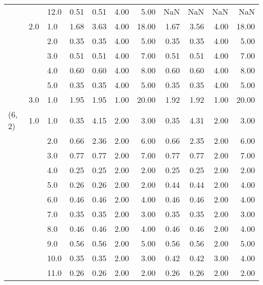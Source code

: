 \begin{tabular}{lllrrrrrrrr}
       &     & 12.0 &       0.51 &      0.51 & 4.00 &   5.00 &        NaN &       NaN &  NaN &    NaN \\
       & 2.0 & 1.0  &       1.68 &      3.63 & 4.00 &  18.00 &       1.67 &      3.56 & 4.00 &  18.00 \\
       &     & 2.0  &       0.35 &      0.35 & 4.00 &   5.00 &       0.35 &      0.35 & 4.00 &   5.00 \\
       &     & 3.0  &       0.51 &      0.51 & 4.00 &   7.00 &       0.51 &      0.51 & 4.00 &   7.00 \\
       &     & 4.0  &       0.60 &      0.60 & 4.00 &   8.00 &       0.60 &      0.60 & 4.00 &   8.00 \\
       &     & 5.0  &       0.35 &      0.35 & 4.00 &   5.00 &       0.35 &      0.35 & 4.00 &   5.00 \\
       & 3.0 & 1.0  &       1.95 &      1.95 & 1.00 &  20.00 &       1.92 &      1.92 & 1.00 &  20.00 \\
(6, 2) & 1.0 & 1.0  &       0.35 &      4.15 & 2.00 &   3.00 &       0.35 &      4.31 & 2.00 &   3.00 \\
       &     & 2.0  &       0.66 &      2.36 & 2.00 &   6.00 &       0.66 &      2.35 & 2.00 &   6.00 \\
       &     & 3.0  &       0.77 &      0.77 & 2.00 &   7.00 &       0.77 &      0.77 & 2.00 &   7.00 \\
       &     & 4.0  &       0.25 &      0.25 & 2.00 &   2.00 &       0.25 &      0.25 & 2.00 &   2.00 \\
       &     & 5.0  &       0.26 &      0.26 & 2.00 &   2.00 &       0.44 &      0.44 & 2.00 &   4.00 \\
       &     & 6.0  &       0.46 &      0.46 & 2.00 &   4.00 &       0.46 &      0.46 & 2.00 &   4.00 \\
       &     & 7.0  &       0.35 &      0.35 & 2.00 &   3.00 &       0.35 &      0.35 & 2.00 &   3.00 \\
       &     & 8.0  &       0.46 &      0.46 & 2.00 &   4.00 &       0.46 &      0.46 & 2.00 &   4.00 \\
       &     & 9.0  &       0.56 &      0.56 & 2.00 &   5.00 &       0.56 &      0.56 & 2.00 &   5.00 \\
       &     & 10.0 &       0.35 &      0.35 & 2.00 &   3.00 &       0.42 &      0.42 & 3.00 &   4.00 \\
       &     & 11.0 &       0.26 &      0.26 & 2.00 &   2.00 &       0.26 &      0.26 & 2.00 &   2.00 \\

\end{tabular}
